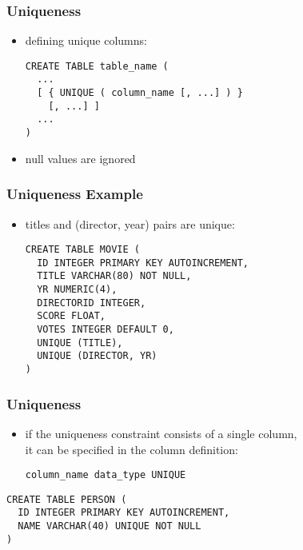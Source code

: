 \documentclass[dvipsnames]{beamer}
\theoremstyle{plain}
\begin{document}
\begin{frame}[fragile]
  \frametitle{Uniqueness}

  \begin{itemize}
    \item defining unique columns:
    \begin{lstlisting}
CREATE TABLE table_name (
  ...
  [ { UNIQUE ( column_name [, ...] ) }
    [, ...] ]
  ...
)
    \end{lstlisting}

    \item null values are ignored
  \end{itemize}
\end{frame}

\begin{frame}[fragile]
  \frametitle{Uniqueness Example}

  \begin{itemize}
    \item titles and (director, year) pairs are unique:
    \begin{lstlisting}
CREATE TABLE MOVIE (
  ID INTEGER PRIMARY KEY AUTOINCREMENT,
  TITLE VARCHAR(80) NOT NULL,
  YR NUMERIC(4),
  DIRECTORID INTEGER,
  SCORE FLOAT,
  VOTES INTEGER DEFAULT 0,
  UNIQUE (TITLE),
  UNIQUE (DIRECTOR, YR)
)
    \end{lstlisting}
  \end{itemize}
\end{frame}

\begin{frame}[fragile]
  \frametitle{Uniqueness}

  \begin{itemize}
    \item if the uniqueness constraint consists of a single column,\\
      it can be specified in the column definition:
    \begin{lstlisting}
column_name data_type UNIQUE
    \end{lstlisting}
  \end{itemize}

  \begin{example}
    \begin{lstlisting}
CREATE TABLE PERSON (
  ID INTEGER PRIMARY KEY AUTOINCREMENT,
  NAME VARCHAR(40) UNIQUE NOT NULL
)
    \end{lstlisting}
  \end{example}
\end{frame}
\end{document}
